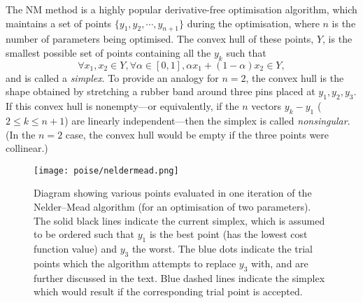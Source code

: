 The NM method is a highly popular derivative-free optimisation algorithm, which maintains a set of points $\{y_1, y_2, \cdots, y_{n+1}\}$ during the optimisation, where $n$ is the number of parameters being optimised.
The convex hull of these points, $Y$, is the smallest possible set of points containing all the $y_k$ such that
\begin{equation}
    \label{eq:convex_hull}
    \forall x_1, x_2 \in Y, \forall \alpha \in [0, 1], \alpha x_1 + (1 - \alpha) x_2 \in Y,
\end{equation}
and is called a \textit{simplex}.
To provide an analogy for $n = 2$, the convex hull is the shape obtained by stretching a rubber band around three pins placed at $y_1, y_2, y_3$.
If this convex hull is nonempty---or equivalently, if the $n$ vectors $y_k - y_1$ ($2 \leq k \leq n + 1$) are linearly independent---then the simplex is called \textit{nonsingular}.
(In the $n = 2$ case, the convex hull would be empty if the three points were collinear.)

\begin{figure}[htb]
    \centering
    \texttt{[image: poise/neldermead.png]}
    \caption[Trial points in an iteration of the Nelder--Mead algorithm]{
        Diagram showing various points evaluated in one iteration of the Nelder--Mead algorithm (for an optimisation of two parameters).
        The solid black lines indicate the current simplex, which is assumed to be ordered such that $y_1$ is the best point (has the lowest cost function value) and $y_3$ the worst.
        The blue dots indicate the trial points which the algorithm attempts to replace $y_3$ with, and are further discussed in the text.
        Blue dashed lines indicate the simplex which would result if the corresponding trial point is accepted.
    }
    \label{fig:neldermead}
\end{figure}

